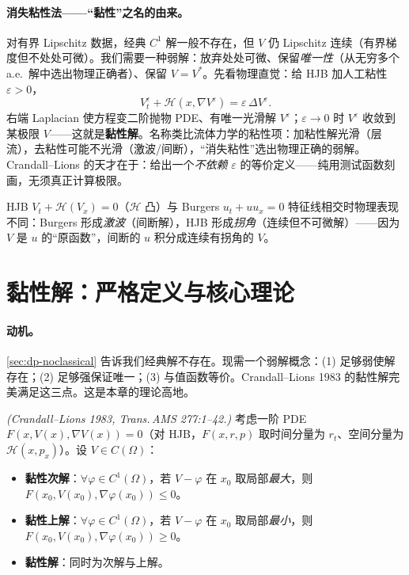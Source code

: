 \paragraph{消失粘性法——“黏性”之名的由来。}对有界 Lipschitz 数据，经典 $C^1$ 解一般不存在，但 $V$ 仍 Lipschitz 连续（有界梯度但不处处可微）。我们需要一种弱解：放弃处处可微、保留\emph{唯一性}（从无穷多个 a.e.\ 解中选出物理正确者）、保留 $V=V^*$。先看物理直觉：给 HJB 加人工粘性 $\varepsilon>0$，
\begin{equation}
  V_t^\varepsilon+\mathcal H(x,\nabla V^\varepsilon)=\varepsilon\,\Delta V^\varepsilon.
  \label{eq:dp-vanishing}
\end{equation}
右端 Laplacian 使方程变二阶抛物 PDE、有唯一光滑解 $V^\varepsilon$；$\varepsilon\to0$ 时 $V^\varepsilon$ 收敛到某极限 $V$——这就是\textbf{黏性解}。名称类比流体力学的粘性项：加粘性解光滑（层流），去粘性可能不光滑（激波/间断），“消失粘性”选出物理正确的弱解。Crandall--Lions 的天才在于：给出一个\emph{不依赖} $\varepsilon$ 的等价定义——纯用测试函数刻画，无须真正计算极限。

\begin{remark}
HJB $V_t+\mathcal H(V_x)=0$（$\mathcal H$ 凸）与 Burgers $u_t+uu_x=0$ 特征线相交时物理表现不同：Burgers 形成\emph{激波}（间断解），HJB 形成\emph{拐角}（连续但不可微解）——因为 $V$ 是 $u$ 的“原函数”，间断的 $u$ 积分成连续有拐角的 $V$。
\end{remark}

\section{黏性解：严格定义与核心理论}
\label{sec:dp-viscosity}

\paragraph{动机。}
\cref{sec:dp-noclassical} 告诉我们经典解不存在。现需一个弱解概念：(1) 足够弱使解存在；(2) 足够强保证唯一；(3) 与值函数等价。Crandall--Lions 1983 的黏性解完美满足这三点。这是本章的理论高地。

\begin{definition}[黏性解]\label{def:dp-viscosity}
\emph{(Crandall--Lions 1983\cite{crandall1983viscosity}, Trans.\,AMS 277:1--42.)} 考虑一阶 PDE $F(x,V(x),\nabla V(x))=0$（对 HJB，$F(x,r,p)$ 取时间分量为 $r_t$、空间分量为 $\mathcal H(x,p_x)$）。设 $V\in C(\Omega)$：
\begin{itemize}
  \item \textbf{黏性次解}：$\forall\varphi\in C^1(\Omega)$，若 $V-\varphi$ 在 $x_0$ 取局部\emph{最大}，则 $F(x_0,V(x_0),\nabla\varphi(x_0))\le0$。
  \item \textbf{黏性上解}：$\forall\varphi\in C^1(\Omega)$，若 $V-\varphi$ 在 $x_0$ 取局部\emph{最小}，则 $F(x_0,V(x_0),\nabla\varphi(x_0))\ge0$。
  \item \textbf{黏性解}：同时为次解与上解。
\end{itemize}
\end{definition}

